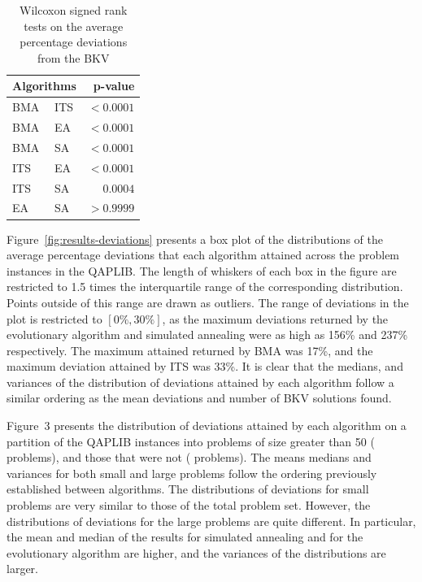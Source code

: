 \begin{table}[h]
    \centering
    \caption{Wilcoxon signed rank tests on the average percentage deviations from the BKV}
    \label{tab:significance-tests}
    \begin{tabularx}{0.29\textwidth}{@{}ll|r@{}}
        \toprule
        \multicolumn{2}{c}{Algorithms} & p-value \\
        \midrule
        BMA & ITS & \(<0.0001\) \\ %
        BMA & EA  & \(<0.0001\) \\ %
        BMA & SA  & \(<0.0001\) \\ %
        ITS & EA  & \(<0.0001\) \\ %
        ITS & SA  & \( 0.0004\) \\ %
        EA  & SA  & \(>0.9999\) \\ %
        \bottomrule
    \end{tabularx}
\end{table}

Figure~\ref{fig:results-deviations} presents a box plot of the distributions of the average percentage deviations that each algorithm attained across the problem instances in the QAPLIB.
The length of whiskers of each box in the figure are restricted to 1.5 times the interquartile range of the corresponding distribution. Points outside of this range are drawn as outliers.
The range of deviations in the plot is restricted to \([0\%, 30\%]\), as the maximum deviations returned by the evolutionary algorithm and simulated annealing were as high as 156\% and 237\% respectively.
The maximum attained returned by BMA was 17\%, and the maximum deviation attained by ITS was 33\%.
It is clear that the medians, and variances of the distribution of deviations attained by each algorithm follow a similar ordering as the mean deviations and number of BKV solutions found.

Figure~3 presents the distribution of deviations attained by each algorithm on a partition of the QAPLIB instances into problems of size greater than 50 ( problems), and those that were not ( problems).
The means medians and variances for both small and large problems follow the ordering previously established between algorithms.
The distributions of deviations for small problems are very similar to those of the total problem set.
However, the distributions of deviations for the large problems are quite different. In particular, the mean and median of the results for simulated annealing and for the evolutionary algorithm are higher, and the variances of the distributions are larger.

